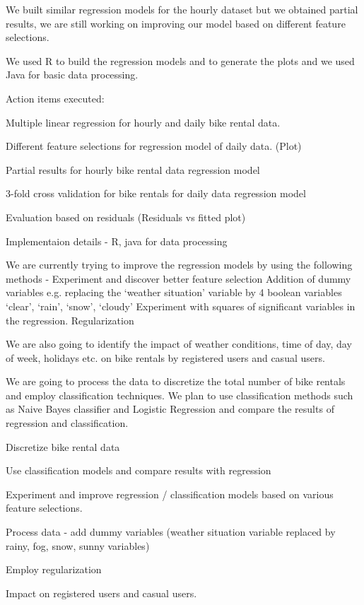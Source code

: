 \documentclass[12pt]{article}
\newcommand{\bibfile}{GroupProject}
\newcommand{\ci}[1]{\cite{#1}}
\begin{document}

We built similar regression models for the hourly dataset but we obtained
partial results, we are still working on improving our model based on different
feature selections.

We used R\ci{rproj} to build the regression models and to generate the plots
and we used Java for basic data processing.

Action items executed:

\begin{packedlist}
\item Multiple linear regression for hourly and daily bike rental data. 
\item Different feature selections for regression model of daily data. (Plot)
\item Partial results for hourly bike rental data regression model
\item 3-fold cross validation for bike rentals for daily data regression model
\item Evaluation based on residuals (Residuals vs fitted plot)
\item Implementaion details - R, java for data processing
\end{packedlist}



We are currently trying to improve the regression models by using the following
methods - Experiment and discover better feature selection Addition of dummy
variables e.g. replacing the `weather situation' variable by 4 boolean
variables `clear', `rain', `snow', `cloudy' Experiment with squares of
significant variables in the regression.  Regularization

We are also going to identify the impact of weather conditions, time of day,
day of week, holidays etc. on bike rentals by registered users and casual
users.

We are going to process the data to discretize the total number of bike rentals
and employ classification techniques. We plan to use classification methods
such as Naive Bayes classifier and Logistic Regression and compare the results
of regression and classification.


\begin{packedlist}
\item Discretize bike rental data 
\item Use classification models and compare results with regression
\item Experiment and improve regression / classification models based on various feature selections.
\item Process data - add dummy variables (weather situation variable replaced by rainy, fog, snow, sunny variables)
\item Employ regularization
\item Impact on registered users and casual users.
\end{packedlist}



\end{document}
